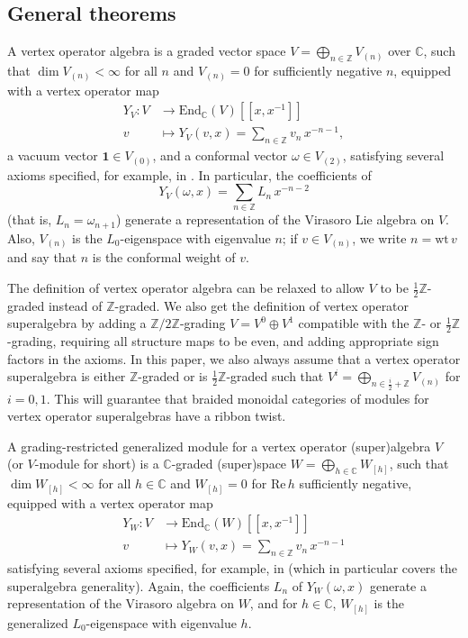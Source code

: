\documentclass[11pt, reqno]{amsart}
\theoremstyle{definition}\newtheorem{defi}[thm]{Definition}
\theoremstyle{definition}\newtheorem{rem}[thm]{Remark}
\theoremstyle{definition}\newtheorem{exam}[thm]{Example}
\theoremstyle{definition}\newtheorem{assum}[thm]{Assumption}
\newcommand{\CC}{\mathbb{C}}
\newcommand{\ZZ}{\mathbb{Z}}
\begin{document}
\subsection{General theorems}

A vertex operator algebra is a graded vector space $V=\bigoplus_{n\in\ZZ} V_{(n)}$ over $\CC$, such that $\dim V_{(n)}<\infty$ for all $n$ and $V_{(n)}=0$ for sufficiently negative $n$, equipped with a vertex operator map
\begin{align*}
Y_V: V & \longrightarrow \mathrm{End}_\CC(V)[[x,x^{-1}]]\\
v & \longmapsto Y_V(v,x) =\sum_{n\in\ZZ} v_n\,x^{-n-1},
\end{align*}
a vacuum vector $\mathbf{1}\in V_{(0)}$, and a conformal vector $\omega\in V_{(2)}$, satisfying several axioms specified, for example, in \cite[Section 3.1]{LL}. In particular, the coefficients of
\begin{equation*}
Y_V(\omega,x)=\sum_{n\in\ZZ} L_n\,x^{-n-2}
\end{equation*}
(that is, $L_n=\omega_{n+1}$) generate a representation of the Virasoro Lie algebra on $V$. Also, $V_{(n)}$ is the $L_0$-eigenspace with eigenvalue $n$; if $v\in V_{(n)}$, we write $n=\mathrm{wt}\,v$ and say that $n$ is the conformal weight of $v$.

The definition of vertex operator algebra can be relaxed to allow $V$ to be $\frac{1}{2}\ZZ$-graded instead of $\ZZ$-graded. We also get the definition of vertex operator superalgebra by adding a $\ZZ/2\ZZ$-grading $V=V^0\oplus V^1$ compatible with the $\ZZ$- or $\frac{1}{2}\ZZ$-grading, requiring all structure maps to be even, and adding appropriate sign factors in the axioms. In this paper, we also always assume that a vertex operator superalgebra is either $\ZZ$-graded or is $\frac{1}{2}\ZZ$-graded such that $V^i=\bigoplus_{n\in\frac{i}{2}+\ZZ} V_{(n)}$ for $i=0,1$. This will guarantee that braided monoidal categories of modules for vertex operator superalgebras have a ribbon twist.

A grading-restricted generalized module
for a vertex operator (super)algebra $V$ (or $V$-module for short) is a $\CC$-graded (super)space $W=\bigoplus_{h\in\CC} W_{[h]}$, such that $\dim W_{[h]}<\infty$ for all $h\in\CC$ and $W_{[h]}=0$ for $\mathrm{Re}\,h$ sufficiently negative, equipped with a vertex operator map
\begin{align*}
Y_W: V & \longrightarrow \mathrm{End}_\CC(W)[[x,x^{-1}]]\\
v & \longmapsto Y_W(v,x) =\sum_{n\in\ZZ} v_n\,x^{-n-1}
\end{align*}
satisfying several axioms specified, for example, in \cite[Definition 3.1]{CKM} (which in particular covers the superalgebra generality). Again, the coefficients $L_n$ of $Y_W(\omega,x)$ generate a representation of the Virasoro algebra on $W$, and for $h\in\CC$, $W_{[h]}$ is the generalized $L_0$-eigenspace with eigenvalue $h$.
\end{document}
